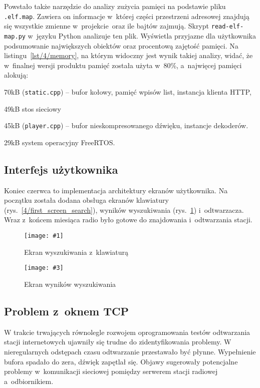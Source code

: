 \documentclass[polish]{aghengthesis}
\let\tempone\itemize
\let\temptwo\enditemize
\renewenvironment{itemize}{\tempone\setlength{\itemsep}{0cm}}{\temptwo}
\newcommand{\imgintss}[5]{
	\begin{figure}[{#5}]
		\centering
		\begin{minipage}{.45\textwidth}
			\centering
			\texttt{[image: \#1]}
			\caption{#2}
			\label{#1}
		\end{minipage}%
		\hfill
		\begin{minipage}{.45\textwidth}
			\centering
			\texttt{[image: \#3]}
			\caption{#4}
			\label{#3}
		\end{minipage}
	\end{figure}
}
\newcommand{\imghss}[4]{\imgintss{#1}{#2}{#3}{#4}{H}}
\newcommand{\lstfile}[3]{
	\noindent
	\hspace{0.1\linewidth}
	\begin{minipage}{0.8\linewidth}
		
	\end{minipage}
	\vspace{0.3cm}
}
\begin{document}
				Powstało także narzędzie do analizy zużycia pamięci na podstawie pliku \lstinline|.elf.map|. Zawiera on informacje w~której części przestrzeni adresowej znajdują się wszystkie zmienne w~projekcie oraz ile bajtów zajmują. Skrypt \lstinline|read-elf-map.py| w~języku Python analizuje ten plik. Wyświetla przyjazne dla użytkownika podsumowanie największych obiektów oraz procentową zajętość pamięci. Na listingu~\ref{lst/4/memory}, na którym widoczny jest wynik takiej analizy, widać, że w~finalnej wersji produktu pamięć została	użyta w~80\%, a~najwięcej pamięci alokują:
				\begin{itemize}
					\item 70kB (\lstinline|static.cpp|) -- bufor kołowy, pamięć wpisów list, instancja klienta HTTP,
					\item 49kB stos sieciowy
					\item 45kB (\lstinline|player.cpp|) -- bufor nieskompresowanego dźwięku, instancje dekoderów.
					\item 29kB system operacyjny FreeRTOS.
				\end{itemize}
				
				\lstfile{default}{Zajętość pamięci RAM}{lst/4/memory}
			
		\subsection{Interfejs użytkownika}
			Koniec czerwca to implementacja architektury ekranów użytkownika. Na początku została dodana obsługa ekranów klawiatury (rys.~\ref{4/first_screen_search}), wyników wyszukiwania (rys.~\ref{4/first_screen_res}) i~odtwarzacza. Wraz z~końcem miesiąca radio było gotowe do znajdowania i~odtwarzania stacji.
			
			\imghss{4/first_screen_search}{Ekran wyszukiwania z~klawiaturą}{4/first_screen_res}{Ekran wyników wyszukiwania}
			
		\subsection{Problem z~oknem TCP}
			W trakcie trwających równolegle rozwojem oprogramowania testów odtwarzania stacji internetowych ujawniły się trudne do zidentyfikowania problemy.
			W nieregularnych odstępach czasu odtwarzanie przestawało być płynne. Wypełnienie bufora spadało do zera, dźwięk zapętlał się. Objawy sugerowały potencjalne problemy w~komunikacji sieciowej pomiędzy serwerem stacji radiowej a~odbiornikiem.
			$ $\\
			
\end{document}

